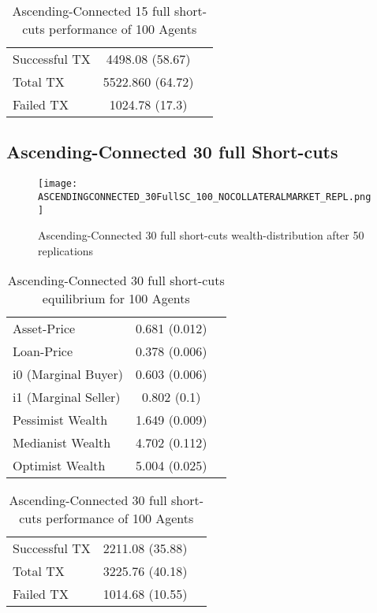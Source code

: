 \documentclass[Bachelorarbeit.tex]{subfiles}
\begin{document}
\begin{table}[!htbp]
	\caption{Ascending-Connected 15 full short-cuts performance of 100 Agents}
	\centering
	\begin{tabular} { l c r }
		\hline
		Successful TX & 4498.08 (58.67) \\
		Total TX & 5522.860 (64.72) \\
		Failed TX & 1024.78 (17.3) \\
		\hline
	\end{tabular}
\end{table}

\subsection{Ascending-Connected 30 full Short-cuts }
\begin{figure}[!htbp]
	\centering
  \texttt{[image: ASCENDINGCONNECTED\_30FullSC\_100\_NOCOLLATERALMARKET\_REPL.png]}
	\caption{Ascending-Connected 30 full short-cuts wealth-distribution after 50 replications}
	\label{fig1}
\end{figure}

\begin{table}[!htbp]
	\caption{Ascending-Connected 30 full short-cuts equilibrium for 100 Agents}
	\centering
	\begin{tabular} { l c r }
		\hline
		Asset-Price & 0.681 (0.012) \\
		Loan-Price & 0.378 (0.006) \\
		i0 (Marginal Buyer) & 0.603 (0.006) \\
		i1 (Marginal Seller) & 0.802 (0.1) \\
		Pessimist Wealth & 1.649 (0.009) \\
		Medianist Wealth & 4.702 (0.112) \\
		Optimist Wealth & 5.004 (0.025) \\
		\hline
	\end{tabular}
\end{table} 

\begin{table}[!htbp]
	\caption{Ascending-Connected 30 full short-cuts performance of 100 Agents}
	\centering
	\begin{tabular} { l c r }
		\hline
		Successful TX & 2211.08 (35.88) \\
		Total TX & 3225.76 (40.18) \\
		Failed TX & 1014.68 (10.55) \\
		\hline
	\end{tabular}
\end{table}
\end{document}
